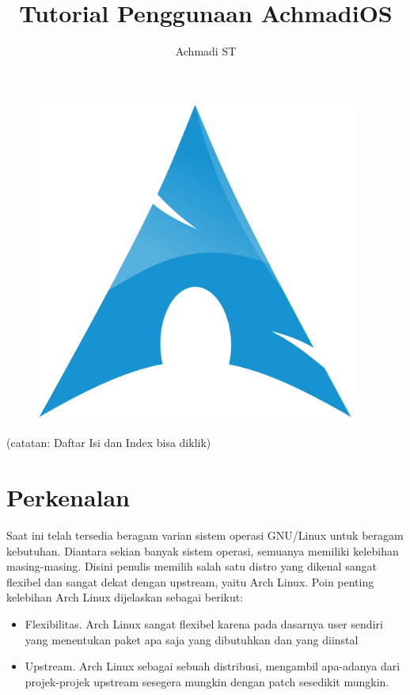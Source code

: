 \documentclass[12pt,]{article}
\title{\Large \bf
Tutorial Penggunaan AchmadiOS
}
\author{Achmadi ST}
\date{}
\begin{document}
	
	\maketitle
	\thispagestyle{empty}
	\pagestyle{empty}
	
	\begin{figure}[h]
		\centering
		\includegraphics[width=300pt]{archlinuxlogo.png}
	\end{figure}

	\newpage
	(catatan: Daftar Isi dan Index bisa diklik)
	\tableofcontents
	
	\newpage
	\section{Perkenalan}

	Saat ini telah tersedia beragam varian sistem operasi GNU/Linux untuk beragam kebutuhan.
	Diantara sekian banyak sistem operasi, semuanya memiliki kelebihan masing-masing.
	Disini penulis memilih salah satu distro yang dikenal sangat flexibel dan sangat dekat dengan upstream, yaitu Arch Linux.
	Poin penting kelebihan Arch Linux dijelaskan sebagai berikut:

	\begin{itemize}
		\item Flexibilitas. Arch Linux sangat flexibel karena pada dasarnya user sendiri yang menentukan paket apa saja yang dibutuhkan dan yang diinstal
		\item Upstream. Arch Linux sebagai sebuah distribusi, mengambil apa-adanya dari projek-projek upstream sesegera mungkin dengan patch sesedikit mungkin.
	\end{itemize}
\end{document}
